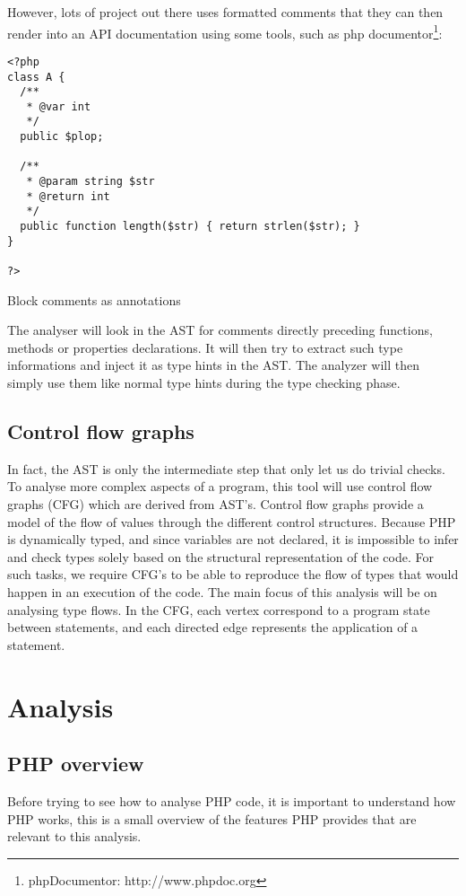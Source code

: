 \documentclass[a4paper]{article}
\begin{document}
However, lots of project out there uses formatted comments that they can then
render into an API documentation using some tools, such as php
documentor\footnote{phpDocumentor: http://www.phpdoc.org}:

\begin{listing}
  \begin{verbatim}
<?php
class A {
  /**
   * @var int
   */
  public $plop;

  /**
   * @param string $str
   * @return int
   */
  public function length($str) { return strlen($str); }
}

?>
\end{verbatim}
  \caption{Block comments as annotations}
\end{listing}

The analyser will look in the AST for comments directly preceding functions,
methods or properties declarations. It will then try to extract such type
informations and inject it as type hints in the AST. The analyzer will then
simply use them like normal type hints during the type checking phase.

\subsection{Control flow graphs}
In fact, the AST is only the intermediate step that only let us do trivial
checks. To analyse more complex aspects of a program, this tool will use
control flow graphs (CFG) which are derived from AST's.  Control flow graphs
provide a model of the flow of values through the different control structures.
Because PHP is dynamically typed, and since variables are not declared, it is
impossible to infer and check types solely based on the structural
representation of the code. For such tasks, we require CFG's to be able to
reproduce the flow of types that would happen in an execution of the code. The
main focus of this analysis will be on analysing type flows. In the CFG, each
vertex correspond to a program state between statements, and each directed edge
represents the application of a statement.

\section{Analysis}
\subsection{PHP overview}
Before trying to see how to analyse PHP code, it is important to understand how
PHP works, this is a small overview of the features PHP provides that are
relevant to this analysis.
\end{document}
